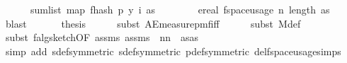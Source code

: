 \begin{isabellebody}
\ \ \ \ \ \ sum{\isacharunderscore}{\kern0pt}list\ {\isacharparenleft}{\kern0pt}map\ {\isacharparenleft}{\kern0pt}f{}{\isacharunderscore}{\kern0pt}hash\ p\ {\isacharparenleft}{\kern0pt}y\ i{\isacharparenright}{\kern0pt}{\isacharparenright}{\kern0pt}\ as{\isacharparenright}{\kern0pt}{\isacharparenright}{\kern0pt}{\isacharparenright}{\kern0pt}\isanewline
\ \ \ \ \ \ \ {\isasymle}\ ereal\ {\isacharparenleft}{\kern0pt}f{}{\isacharunderscore}{\kern0pt}space{\isacharunderscore}{\kern0pt}usage\ {\isacharparenleft}{\kern0pt}n{\isacharcomma}{\kern0pt}\ length\ as{\isacharcomma}{\kern0pt}\ {\isasymepsilon}{\isacharcomma}{\kern0pt}\ {\isasymdelta}{\isacharparenright}{\kern0pt}{\isacharparenright}{\kern0pt}{\isachardoublequoteclose}\ \isamarkupfalse%
\ blast\isanewline
\ \ \isamarkupfalse%
\isanewline
\isanewline
\ \ \isamarkupfalse%
\ {\isacharquery}{\kern0pt}thesis\isanewline
\ \ \ \ \isamarkupfalse%
\ {\isacharparenleft}{\kern0pt}subst\ AE{\isacharunderscore}{\kern0pt}measure{\isacharunderscore}{\kern0pt}pmf{\isacharunderscore}{\kern0pt}iff{\isacharparenright}{\kern0pt}\isanewline
\ \ \ \ \isamarkupfalse%
\ {\isacharparenleft}{\kern0pt}subst\ M{\isacharunderscore}{\kern0pt}def{\isacharparenright}{\kern0pt}\isanewline
\ \ \ \ \isamarkupfalse%
\ {\isacharparenleft}{\kern0pt}subst\ f{}{\isacharunderscore}{\kern0pt}alg{\isacharunderscore}{\kern0pt}sketch{\isacharbrackleft}{\kern0pt}OF\ assms{\isacharparenleft}{\kern0pt}{}{\isacharparenright}{\kern0pt}\ assms{\isacharparenleft}{\kern0pt}{}{\isacharparenright}{\kern0pt}{\isacharcomma}{\kern0pt}\ \ n{\isacharequal}{\kern0pt}{\isachardoublequoteopen}n{\isachardoublequoteclose}\ \ as{\isacharequal}{\kern0pt}{\isachardoublequoteopen}as{\isachardoublequoteclose}{\isacharbrackright}{\kern0pt}{\isacharparenright}{\kern0pt}\isanewline
\ \ \ \ \isamarkupfalse%
\ {\isacharparenleft}{\kern0pt}simp\ add{\isacharcolon}{\kern0pt}\ sdef{\isacharbrackleft}{\kern0pt}symmetric{\isacharbrackright}{\kern0pt}\ sdef{\isacharbrackleft}{\kern0pt}symmetric{\isacharbrackright}{\kern0pt}\ p{\isacharunderscore}{\kern0pt}def{\isacharbrackleft}{\kern0pt}symmetric{\isacharbrackright}{\kern0pt}\ del{\isacharcolon}{\kern0pt}f{}{\isacharunderscore}{\kern0pt}space{\isacharunderscore}{\kern0pt}usage{\isachardot}{\kern0pt}simps{\isacharparenright}{\kern0pt}\isanewline

\end{isabellebody}
